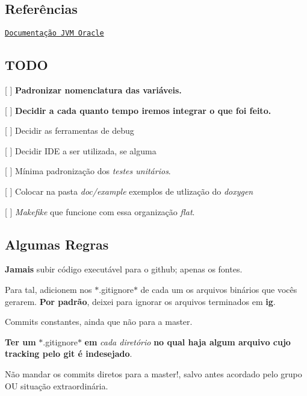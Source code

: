 \subsection*{Referências}

\href{https://docs.oracle.com/javase/specs/jvms/se7/html/}{\tt Documentação J\+VM Oracle}

\subsection*{T\+O\+DO}


\begin{DoxyItemize}
\item \mbox{[} \mbox{]} {\bfseries Padronizar nomenclatura das variáveis.}
\item \mbox{[} \mbox{]} {\bfseries Decidir a cada quanto tempo iremos integrar o que foi feito.}
\item \mbox{[} \mbox{]} Decidir as ferramentas de debug
\item \mbox{[} \mbox{]} Decidir I\+DE a ser utilizada, se alguma
\item \mbox{[} \mbox{]} Mínima padronização dos {\itshape testes unitários}.
\item \mbox{[} \mbox{]} Colocar na pasta {\itshape doc/example} exemplos de utlização do {\itshape doxygen}
\item \mbox{[} \mbox{]} {\itshape Makefike} que funcione com essa organização {\itshape flat}.
\end{DoxyItemize}

\subsection*{Algumas Regras}


\begin{DoxyItemize}
\item {\bfseries Jamais} subir código executável para o github; apenas os fontes.
\begin{DoxyItemize}
\item Para tal, adicionem nos $\ast$.gitignore$\ast$ de cada um os arquivos binários que vocês gerarem. {\bfseries Por padrão}, deixei para ignorar os arquivos terminados em {\bfseries ig}.
\end{DoxyItemize}
\item Commits constantes, ainda que não para a master.
\item {\bfseries Ter um} $\ast$.gitignore$\ast$ {\bfseries em} {\itshape cada diretório} {\bfseries no qual haja algum arquivo cujo tracking pelo git é indesejado}.
\item Não mandar os commits diretos para a master!, salvo antes acordado pelo grupo OU situação extraordinária. 
\end{DoxyItemize}